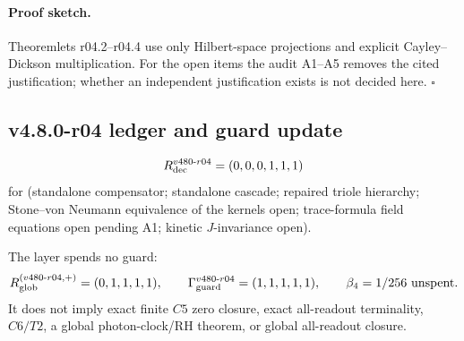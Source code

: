 \paragraph{Proof sketch.}
Theoremlets r04.2--r04.4 use only Hilbert-space projections and explicit Cayley--Dickson
multiplication.  For the open items the audit A1--A5 removes the cited justification; whether
an independent justification exists is not decided here.  \(\square\)

\subsection*{v4.8.0-r04 ledger and guard update}
\label{subsec:v480-r04-ledger-guard}

\[
R_{\rm dec}^{v480\text{-}r04}=(0,0,0,1,1,1)
\]
for (standalone compensator; standalone cascade; repaired triole hierarchy; Stone--von Neumann
equivalence of the kernels open; trace-formula field equations open pending A1; kinetic
\(J\)-invariance open).

The layer spends no guard:
\[
R_{\rm glob}^{(v480\text{-}r04,+)}=(0,1,1,1,1),
\qquad
\Gamma_{\rm guard}^{v480\text{-}r04}=(1,1,1,1,1),
\qquad
\beta_4=1/256\ \text{unspent}.
\]
It does not imply exact finite \(C5\) zero closure, exact all-readout terminality,
\(C6/T2\), a global photon-clock/RH theorem, or global all-readout closure.

